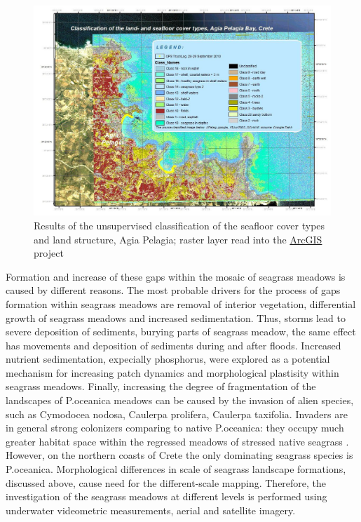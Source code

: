 \documentclass[10pt, a4paper]{article}
\begin{document}
\begin{figure}[h]
	\begin{center}
		\includegraphics[scale=0.25]{Fig-39.jpg}
		\caption{Results of the unsupervised classification of the seafloor cover types and land structure, Agia Pelagia; raster layer read into the \href{http://www.esri.com/software/arcgis/index.html}{ArcGIS} project}
		\label{fig:42}
	\end{center}
\end{figure}

Formation and increase of these
gaps within the mosaic of seagrass meadows is caused by different reasons. The most probable
drivers for the process of gaps formation within seagrass meadows are removal of interior vegetation,
differential growth of seagrass meadows and increased sedimentation. Thus, storms lead to severe
deposition of sediments, burying parts of seagrass meadow, the same effect has movements and
deposition of sediments during and after floods\cite{Bell99}\label{Bell99}.
Increased nutrient sedimentation, expecially phosphorus, were explored \cite{Jensen01}\label{Jensen01} as a
potential mechanism for increasing patch dynamics and morphological plastisity within seagrass
meadows. Finally, increasing the degree of fragmentation of the landscapes of P.oceanica meadows
can be caused by the invasion of alien species, such as Cymodocea nodosa, Caulerpa prolifera,
Caulerpa taxifolia. Invaders are in general strong colonizers comparing to native P.oceanica: they
occupy much greater habitat space within the regressed meadows of stressed native seagrass
\cite{Montefalcone10}\label{Montefalcone10}. However, on the northern coasts of Crete the only dominating seagrass
species is P.oceanica.
Morphological differences in scale of seagrass landscape formations, discussed above, cause need for
the different-scale mapping. Therefore, the investigation of the seagrass meadows at different levels is
performed using underwater videometric measurements, aerial and satellite imagery.
\end{document}
